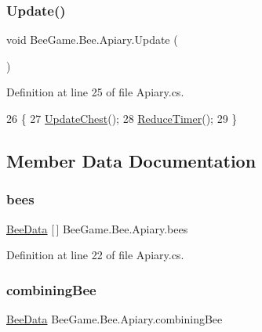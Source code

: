\subsubsection{\texorpdfstring{Update()}{Update()}}
{\footnotesize\ttfamily void Bee\+Game.\+Bee.\+Apiary.\+Update (\begin{DoxyParamCaption}{ }\end{DoxyParamCaption})\hspace{0.3cm}{\ttfamily [private]}}



Definition at line 25 of file Apiary.\+cs.


\begin{DoxyCode}
26         \{
27             \hyperlink{class_bee_game_1_1_inventory_1_1_chest_inventory_aecb5561a169d112e46b2270d8b8548e5}{UpdateChest}();
28             \hyperlink{class_bee_game_1_1_bee_1_1_apiary_a13ae008ce398b022806823585c6eb6de}{ReduceTimer}();
29         \}
\end{DoxyCode}


\subsection{Member Data Documentation}
\mbox{\label{class_bee_game_1_1_bee_1_1_apiary_abcab0d8cecc18c58a9d01cdf997c7420}} 
\subsubsection{\texorpdfstring{bees}{bees}}
{\footnotesize\ttfamily \hyperlink{struct_bee_game_1_1_bee_1_1_bee_data}{Bee\+Data} \mbox{[}$\,$\mbox{]} Bee\+Game.\+Bee.\+Apiary.\+bees}



Definition at line 22 of file Apiary.\+cs.

\mbox{\label{class_bee_game_1_1_bee_1_1_apiary_a3b3bbe1a8ba0be1c3310a2660b1cdf42}} 
\subsubsection{\texorpdfstring{combining\+Bee}{combiningBee}}
{\footnotesize\ttfamily \hyperlink{struct_bee_game_1_1_bee_1_1_bee_data}{Bee\+Data} Bee\+Game.\+Bee.\+Apiary.\+combining\+Bee}




